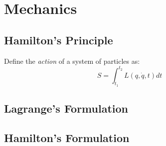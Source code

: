 \part{Mechanics}

\chapter{Hamilton's Principle}

Define the \textit{action} of a system of particles as: 
\begin{equation}
  S = \int_{t_1}^{t_2} L(q, \dot{q}, t)dt
\end{equation}

\chapter{Lagrange's Formulation}

\chapter{Hamilton's Formulation}
